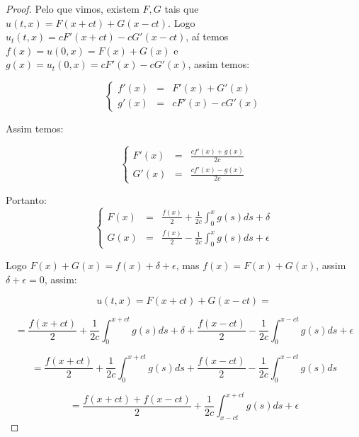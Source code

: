 \documentclass[11pt,twoside,a4paper]{book}
\begin{document}
\begin{proof}
Pelo que vimos, existem $F,G$ tais que $u(t,x)=F(x+ct)+G(x-ct)$. Logo $u_t(t,x)=cF'(x+ct)-cG'(x-ct)$, aí temos $f(x)=u(0,x)=F(x)+G(x)$ e $g(x)=u_t(0,x)=cF'(x)-cG'(x)$, assim temos:

\[
\left\{
\begin{array}{ccc}
     f'(x) & = & F'(x)+G'(x) \\
     g'(x) & = & cF'(x)-cG'(x)
\end{array}
\right.
\]

\noindent
Assim temos:

\[
\left\{
\begin{array}{ccc}
     F'(x) & = & \frac{cf'(x)+g(x)}{2c} \\
     G'(x) & = & \frac{cf'(x)-g(x)}{2c}
\end{array}
\right.
\]

\noindent
Portanto:
\[
\left\{
\begin{array}{ccc}
     F(x) & = & \frac{f(x)}{2} + \frac{1}{2c}\int_{0}^xg(s)ds+\delta \\
     G(x) & = & \frac{f(x)}{2} - \frac{1}{2c}\int_{0}^xg(s)ds+\epsilon
\end{array}
\right.
\]

\noindent
Logo $F(x)+G(x)=f(x)+\delta+\epsilon$, mas $f(x)=F(x)+G(x)$, assim $\delta+\epsilon=0$, assim:

\[
u(t,x)=F(x+ct)+G(x-ct)=
\]

\[
=\frac{f(x+ct)}{2} + \frac{1}{2c}\int_{0}^{x+ct}g(s)ds+\delta+\frac{f(x-ct)}{2} - \frac{1}{2c}\int_{0}^{x-ct}g(s)ds+\epsilon
\]

\[
=\frac{f(x+ct)}{2} + \frac{1}{2c}\int_{0}^{x+ct}g(s)ds+\frac{f(x-ct)}{2} - \frac{1}{2c}\int_{0}^{x-ct}g(s)ds
\]

\[
=\frac{f(x+ct)+f(x-ct)}{2} + \frac{1}{2c}\int_{x-ct}^{x+ct}g(s)ds+\epsilon
\]
\end{proof}
\end{document}
